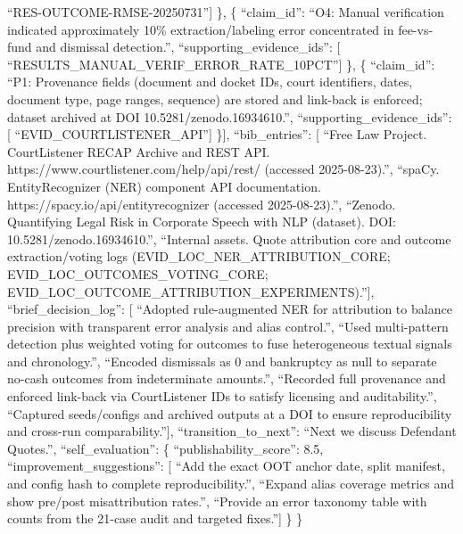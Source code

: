 ``RES-OUTCOME-RMSE-20250731''{]}
\},
\{
``claim\_id'': ``O4: Manual verification indicated approximately 10\% extraction/labeling error concentrated in fee-vs-fund and dismissal detection.'',
``supporting\_evidence\_ids'': {[}
``RESULTS\_MANUAL\_VERIF\_ERROR\_RATE\_10PCT''{]}
\},
\{
``claim\_id'': ``P1: Provenance fields (document and docket IDs, court identifiers, dates, document type, page ranges, sequence) are stored and link-back is enforced; dataset archived at DOI 10.5281/zenodo.16934610.'',
``supporting\_evidence\_ids'': {[}
``EVID\_COURTLISTENER\_API''{]}
\}{]},
``bib\_entries'': {[}
``Free Law Project. CourtListener RECAP Archive and REST API. https://www.courtlistener.com/help/api/rest/ (accessed 2025-08-23).'',
``spaCy. EntityRecognizer (NER) component API documentation. https://spacy.io/api/entityrecognizer (accessed 2025-08-23).'',
``Zenodo. Quantifying Legal Risk in Corporate Speech with NLP (dataset). DOI: 10.5281/zenodo.16934610.'',
``Internal assets. Quote attribution core and outcome extraction/voting logs (EVID\_LOC\_NER\_ATTRIBUTION\_CORE; EVID\_LOC\_OUTCOMES\_VOTING\_CORE; EVID\_LOC\_OUTCOME\_ATTRIBUTION\_EXPERIMENTS).''{]},
``brief\_decision\_log'': {[}
``Adopted rule-augmented NER for attribution to balance precision with transparent error analysis and alias control.'',
``Used multi-pattern detection plus weighted voting for outcomes to fuse heterogeneous textual signals and chronology.'',
``Encoded dismissals as 0 and bankruptcy as null to separate no-cash outcomes from indeterminate amounts.'',
``Recorded full provenance and enforced link-back via CourtListener IDs to satisfy licensing and auditability.'',
``Captured seeds/configs and archived outputs at a DOI to ensure reproducibility and cross-run comparability.''{]},
``transition\_to\_next'': ``Next we discuss Defendant Quotes.'',
``self\_evaluation'': \{
``publishability\_score'': 8.5,
``improvement\_suggestions'': {[}
``Add the exact OOT anchor date, split manifest, and config hash to complete reproducibility.'',
``Expand alias coverage metrics and show pre/post misattribution rates.'',
``Provide an error taxonomy table with counts from the 21-case audit and targeted fixes.''{]}
\}
\}

